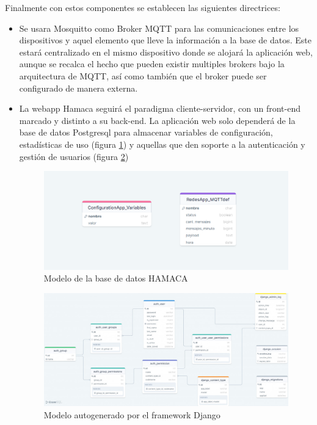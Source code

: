 Finalmente con estos componentes se establecen las siguientes directrices:
\begin{itemize}

\item Se usara Mosquitto como Broker MQTT para las comunicaciones entre los dispositivos y aquel elemento que lleve la información a la base de datos. Este estará centralizado en el mismo dispositivo donde se alojará la aplicación web, aunque se recalca el hecho que pueden existir multiples brokers bajo la arquitectura de MQTT, así como también que el broker puede ser configurado de manera externa.


\item La webapp Hamaca seguirá el paradigma cliente-servidor, con un front-end marcado y distinto a su back-end. La aplicación web solo dependerá de la base de datos Postgresql para almacenar variables de configuración, estadísticas de uso (figura \ref{fig:psql_hamaca_db}) y aquellas que den soporte a la autenticación y gestión de usuarios (figura \ref{fig:django_schema})
\begin{figure}[!htb]
\centering
\includegraphics[scale=0.25]{./Figuras/psql_hamaca_db.png}
\caption{Modelo de la base de datos HAMACA}
\label{fig:psql_hamaca_db}
\vspace*{-10pt}
\end{figure}
\begin{figure}[!htb]
\centering
\includegraphics[scale=0.425]{./Figuras/django_schema.jpg}
\caption{Modelo autogenerado por el framework Django}
\label{fig:django_schema}
\vspace*{-10pt}
\end{figure}


\end{itemize}
